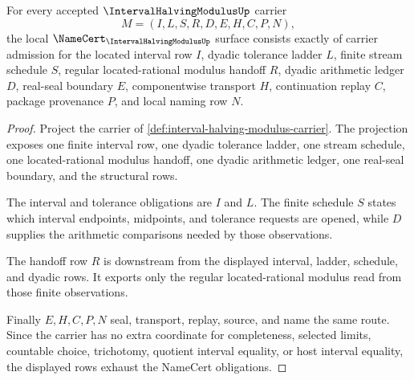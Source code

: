 \begin{theorem}
\label{thm:interval-halving-modulus-namecert-obligations}
For every accepted $\IntervalHalvingModulusUp$ carrier
$$
M=(I,L,S,R,D,E,H,C,P,N),
$$
the local $\NameCert_{\IntervalHalvingModulusUp}$ surface consists exactly of carrier admission for the located interval row $I$, dyadic tolerance ladder $L$, finite stream schedule $S$, regular located-rational modulus handoff $R$, dyadic arithmetic ledger $D$, real-seal boundary $E$, componentwise transport $H$, continuation replay $C$, package provenance $P$, and local naming row $N$.
\end{theorem}
\begin{proof}
Project the carrier of \autoref{def:interval-halving-modulus-carrier}. The projection exposes one finite interval row, one dyadic tolerance ladder, one stream schedule, one located-rational modulus handoff, one dyadic arithmetic ledger, one real-seal boundary, and the structural rows.

The interval and tolerance obligations are $I$ and $L$. The finite schedule $S$ states which interval endpoints, midpoints, and tolerance requests are opened, while $D$ supplies the arithmetic comparisons needed by those observations.

The handoff row $R$ is downstream from the displayed interval, ladder, schedule, and dyadic rows. It exports only the regular located-rational modulus read from those finite observations.

Finally $E,H,C,P,N$ seal, transport, replay, source, and name the same route. Since the carrier has no extra coordinate for completeness, selected limits, countable choice, trichotomy, quotient interval equality, or host interval equality, the displayed rows exhaust the NameCert obligations.
\end{proof}


